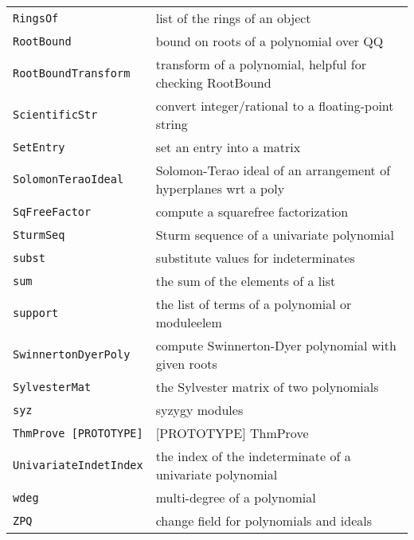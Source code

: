\documentclass[a4paper]{mybook}
\begin{document}
\begin{center}
\begin{longtable}{ll}
{\verb~RingsOf~} &
      list of the rings of an object\\
   
{\verb~RootBound~} &
      bound on roots of a polynomial over QQ\\
   
{\verb~RootBoundTransform~} &
      transform of a polynomial, helpful for checking RootBound\\
   
{\verb~ScientificStr~} &
      convert integer/rational to a floating-point string\\
   
{\verb~SetEntry~} &
      set an entry into a matrix\\
   
{\verb~SolomonTeraoIdeal~} &
      Solomon-Terao ideal of an arrangement of hyperplanes wrt a poly\\
   
{\verb~SqFreeFactor~} &
      compute a squarefree factorization\\
   
{\verb~SturmSeq~} &
      Sturm sequence of a univariate polynomial\\
   
{\verb~subst~} &
      substitute values for indeterminates\\
   
{\verb~sum~} &
      the sum of the elements of a list\\
   
{\verb~support~} &
      the list of terms of a polynomial or moduleelem\\
   
{\verb~SwinnertonDyerPoly~} &
      compute Swinnerton-Dyer polynomial with given roots\\
   
{\verb~SylvesterMat~} &
      the Sylvester matrix of two polynomials\\
   
{\verb~syz~} &
      syzygy modules\\
   
{\verb~ThmProve [PROTOTYPE]~} &
      [PROTOTYPE] ThmProve\\
   
{\verb~UnivariateIndetIndex~} &
      the index of the indeterminate of a univariate polynomial\\
   
{\verb~wdeg~} &
      multi-degree of a polynomial\\
   
{\verb~ZPQ~} &
      change field for polynomials and ideals\\
   
\end{longtable}
\end{center}
\end{document}
